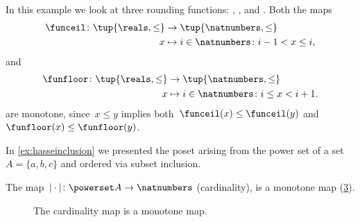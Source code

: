 \begin{figure}[h!]
  \caption{}
  \label{fig:unit_manufacturing}
\end{figure}

\begin{figure}[h!]
  \caption{}
  \label{fig:total_manufacturing}
\end{figure}





\begin{example}
  \label{ex:rounding-functions}
  In this example we look at three rounding functions: \funceil, \funfloor, and \rtntte. Both the maps
  \begin{equation*}
    \begin{aligned}
      \funceil\colon \tup{\reals,\leq}&\to \tup{\natnumbers,\leq}\\
      x&\mapsto i \in \natnumbers \colon i-1<x\leq i,
    \end{aligned}
  \end{equation*}
  and
  \begin{equation*}
    \begin{aligned}
      \funfloor\colon \tup{\reals,\leq}&\to \tup{\natnumbers,\leq}\\
      x&\mapsto i \in \natnumbers \colon i\leq x< i+1.
    \end{aligned}
  \end{equation*}
  are monotone, since~$x\leq y$ implies both~$\funceil(x)\leq \funceil(y)$ and~$\funfloor(x)\leq\funfloor(y)$.
\end{example}

\begin{example}
  In \cref{ex:hasseinclusion} we presented the poset arising from the power set of a set~$A=\{a,b,c\}$ and ordered via subset inclusion.

  The map~$\vert \cdot \vert \colon \powerset A \to \natnumbers$ (cardinality), is a monotone map (\cref{fig:cardinality}).
  \begin{figure}[h!]
    \begin{center}
    \end{center}
    \caption{The cardinality map is a monotone map. \label{fig:cardinality}}
  \end{figure}
\end{example}

